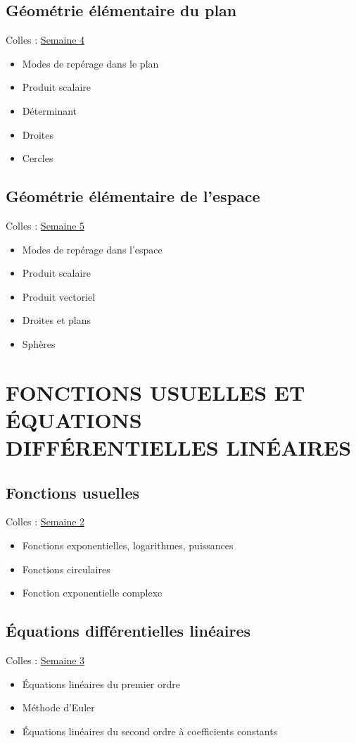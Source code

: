 \subsection{G\'eom\'etrie \'el\'ementaire du plan}
Colles : \href{S4.pdf}{Semaine 4}
\begin{itemize}
\item Modes de rep\'erage dans le plan

\item Produit scalaire

\item D\'eterminant

\item Droites

\item Cercles
\end{itemize}

\subsection{G\'eom\'etrie \'el\'ementaire de l'espace}
Colles : \href{S5.pdf}{Semaine 5}
\begin{itemize}
\item Modes de rep\'erage dans l'espace
\item Produit scalaire
\item Produit vectoriel
\item Droites et plans
\item Sph\`eres
\end{itemize}

\section{FONCTIONS USUELLES ET \'EQUATIONS DIFF\'ERENTIELLES
LIN\'EAIRES}

 \subsection{Fonctions usuelles}
Colles : \href{S2.pdf}{Semaine 2}

\begin{itemize}
 \item Fonctions exponentielles, logarithmes, puissances
\item Fonctions circulaires
\item Fonction exponentielle complexe
\end{itemize}

\subsection{\'Equations diff\'erentielles lin\'eaires}
Colles : \href{S3.pdf}{Semaine 3}
\begin{itemize}
\item \'Equations lin\'eaires du premier ordre
\item M\'ethode d'Euler
\item \'Equations lin\'eaires du second ordre \`a coefficients
constants
\end{itemize}

